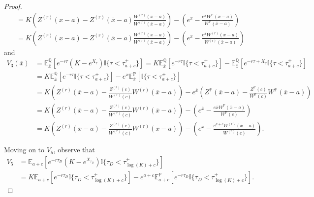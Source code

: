 \documentclass[10pt]{amsart}
\def\E{{\mathbb{E}}}
\def\P{{\mathbb{P}}}
\def\Q{{\mathbb{Q}}}
\def \R{{{\rm I{\!}\rm R}}}
\def \I{{\mathbb{I}}}
\def\P{{\mathbb P}} \def\le{\left} \def\ri{\right} \def\i{\infty}
\def\E{{\mathbb E}} \def\PP{\mc P} \def\Z{{\mathbb Z}} \def\R{{\mathbb R}}
\begin{document}
\begin{proof}
\begin{align}
				\nonumber & = K\left( Z^{(r)}(x-a) - Z^{(r)}(\overline{x}-a)\frac{W^{(r)}(x-a)}{W^{(r)}(\overline{x}-a)} \right) - \left( e^x - \frac{e^x W^\P(x-a)}{W^\P(\overline{x}-a)} \right) \\
				& = K\left( Z^{(r)}(x-a) - Z^{(r)}(\overline{x}-a)\frac{W^{(r)}(x-a)}{W^{(r)}(\overline{x}-a)} \right) - \left( e^x - \frac{e^{\overline{x}} W^{(r)}(x-a)}{W^{(r)}(\overline{x}-a)} \right)\label{V1}
			\end{align}
			and
			\begin{align}
				\nonumber	V_3(\overline{x}) &= \E^\Q_{\overline{x}}\left[ e^{-r\tau} \left( K - e^{X_\tau} \right) \I
				\{ \tau < \tau_{a+c}^+ \} \right]  = K\E^\Q_{\overline{x}} \left[ e^{-r\tau} \I
				\{ \tau < \tau_{a+c}^+ \} \right] - \E^\Q_{\overline{x}}\left[ e^{-r\tau + X_\tau} \I
				\{ \tau < \tau_{a+c}^+ \} \right] \\
				\nonumber & =  K\E^\Q_{\overline{x}} \left[ e^{-r\tau} \I
				\{ \tau < \tau_{a+c}^+ \} \right] - e^x \E^\P_{\overline{x}}\left[ \I
				\{ \tau < \tau_{a+c}^+ \} \right] \\
				\nonumber &=  K\left( Z^{(r)}(\overline{x}-a) - \frac{Z^{(r)}(c)}{W^{(r)}(c)}W^{(r)}(\overline{x}-a) \right) -e^{\overline{x}}\left( Z^{\P}(\overline{x}-a) - \frac{Z^{\P}(c)}{W^{\P}(c)}W^{\P}(\overline{x}-a) \right) \\
				\nonumber & =K\left( Z^{(r)}(\overline{x}-a) - \frac{Z^{(r)}(c)}{W^{(r)}(c)}W^{(r)}(\overline{x}-a) \right) - \left( e^{\overline{x}} - \frac{e{\overline{x}} W^\P(\overline{x}-a)}{W^\P(c)} \right) \\
				& =K\left( Z^{(r)}(\overline{x}-a) - \frac{Z^{(r)}(c)}{W^{(r)}(c)}W^{(r)}(\overline{x}-a) \right) - \left( e^{\overline{x}} - \frac{e^{a+c} W^{(r)}(\overline{x}-a)}{W^{(r)}(c)} \right).\label{V3}
			\end{align}
			
			Moving on to $V_5$, observe that	
			\begin{align*}
				V_5 &= \E_{a+c} \left[ e^{-r\tau_D}\left( K - e^{X_{\tau_D}} \right) \I \{ \tau_D < \tau_{\log(K)+c}^+ \} \right] \\
				\nonumber & = K\E_{a+c} \left[ e^{-r\tau_D} \I \{ \tau_D < \tau_{\log(K)+c}^+ \} \right] - e^{a+c}\E^\P_{a+c} \left[ e^{-r\tau_D} \I \{ \tau_D < \tau_{\log(K)+c}^+ \} \right].
			\end{align*}
			

\end{proof}
\end{document}
